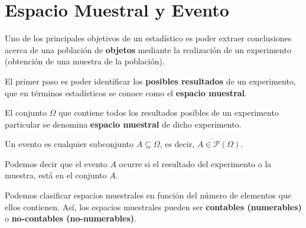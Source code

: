 \documentclass[
  letterpaper,
  DIV=11,
  numbers=noendperiod]{scrreprt}
\begin{document}
\section{Espacio Muestral y Evento}\label{espacio-muestral-y-evento}

Uno de los principales objetivos de un estadístico es poder extraer
conclusiones acerca de una población de \textbf{objetos} mediante la
realización de un experimento (obtención de una muestra de la
población).

El primer paso es poder identificar los \textbf{posibles resultados} de
un experimento, que en términos estadísticos se conoce como el
\textbf{espacio muestral}.

\begin{tcolorbox}[enhanced jigsaw, arc=.35mm, bottomrule=.15mm, bottomtitle=1mm, breakable, colback=white, colbacktitle=quarto-callout-note-color!10!white, colframe=quarto-callout-note-color-frame, coltitle=black, left=2mm, leftrule=.75mm, opacityback=0, opacitybacktitle=0.6, rightrule=.15mm, title={Espacio muestral}, titlerule=0mm, toprule=.15mm, toptitle=1mm]

El conjunto \(\Omega\) que contiene todos los resultados posibles de un
experimento particular se denomina \textbf{espacio muestral} de dicho
experimento.

\end{tcolorbox}

\begin{tcolorbox}[enhanced jigsaw, arc=.35mm, bottomrule=.15mm, bottomtitle=1mm, breakable, colback=white, colbacktitle=quarto-callout-note-color!10!white, colframe=quarto-callout-note-color-frame, coltitle=black, left=2mm, leftrule=.75mm, opacityback=0, opacitybacktitle=0.6, rightrule=.15mm, title={Evento}, titlerule=0mm, toprule=.15mm, toptitle=1mm]

Un evento es cualquier subconjunto \(A \subseteq \Omega\), es decir,
\(A \in \mathcal{P}(\Omega)\).

Podemos decir que el evento \(A\) ocurre si el resultado del experimento
o la muestra, está en el conjunto \(A\).

\end{tcolorbox}

Podemos clasificar espacios muestrales en función del número de
elementos que ellos contienen. Así, los espacios muestrales pueden ser
\textbf{contables (numerables)} o \textbf{no-contables (no-numerables)}.
\end{document}
